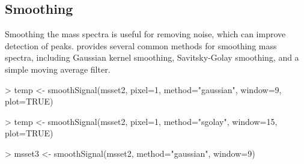 \documentclass[a4paper]{article}
\begin{document}
\subsection{Smoothing}

Smoothing the mass spectra is useful for removing noise, which can improve detection of peaks.  provides several common methods for smoothing mass spectra, including Gaussian kernel smoothing, Savitsky-Golay smoothing, and a simple moving average filter.
\begin{Schunk}
\begin{Sinput}
> temp <- smoothSignal(msset2, pixel=1, method="gaussian", window=9, plot=TRUE)
\end{Sinput}
\end{Schunk}
\begin{Schunk}
\begin{Sinput}
> temp <- smoothSignal(msset2, pixel=1, method="sgolay", window=15, plot=TRUE)
\end{Sinput}
\end{Schunk}
\begin{Schunk}
\begin{Sinput}
> msset3 <- smoothSignal(msset2, method="gaussian", window=9)
\end{Sinput}
\end{Schunk}
\end{document}
